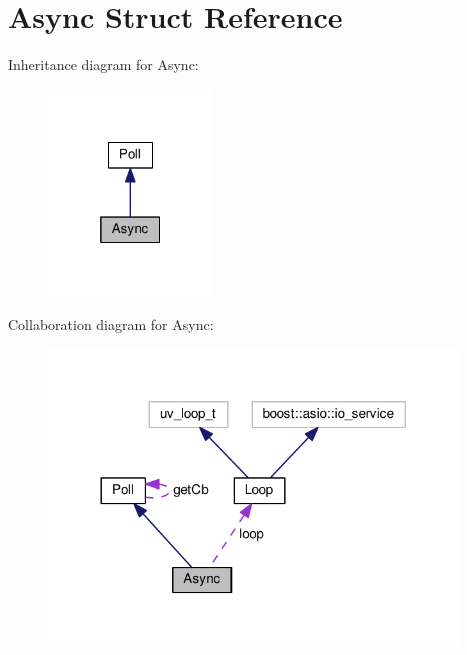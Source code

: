 \hypertarget{struct_async}{}\section{Async Struct Reference}
\label{struct_async}


Inheritance diagram for Async\+:
\nopagebreak
\begin{figure}[H]
\begin{center}
\leavevmode
\includegraphics[width=124pt]{struct_async__inherit__graph}
\end{center}
\end{figure}


Collaboration diagram for Async\+:
\nopagebreak
\begin{figure}[H]
\begin{center}
\leavevmode
\includegraphics[width=308pt]{struct_async__coll__graph}
\end{center}
\end{figure}
